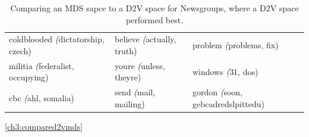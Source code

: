 \begin{table}[]
\begin{tabular}{lll}
		coldblooded \textit({dictatorship, czech)}      & believe \textit({actually, truth)}        & problem \textit({problems, fix)}                    \\
		militia \textit({federalist, occupying)}        & youre \textit({unless, theyre)}           & windows \textit({31, dos)}                          \\
		cbc \textit({ahl, somalia)}                     & send \textit({mail, mailing)}             & gordon \textit({soon, gebcadredslpittedu)}         
	\end{tabular}
	\caption{Comparing an MDS sapce to a D2V space for Newsgroups, where a D2V space performed best.}\ref{ch3:compared2vmds}
\end{table}








